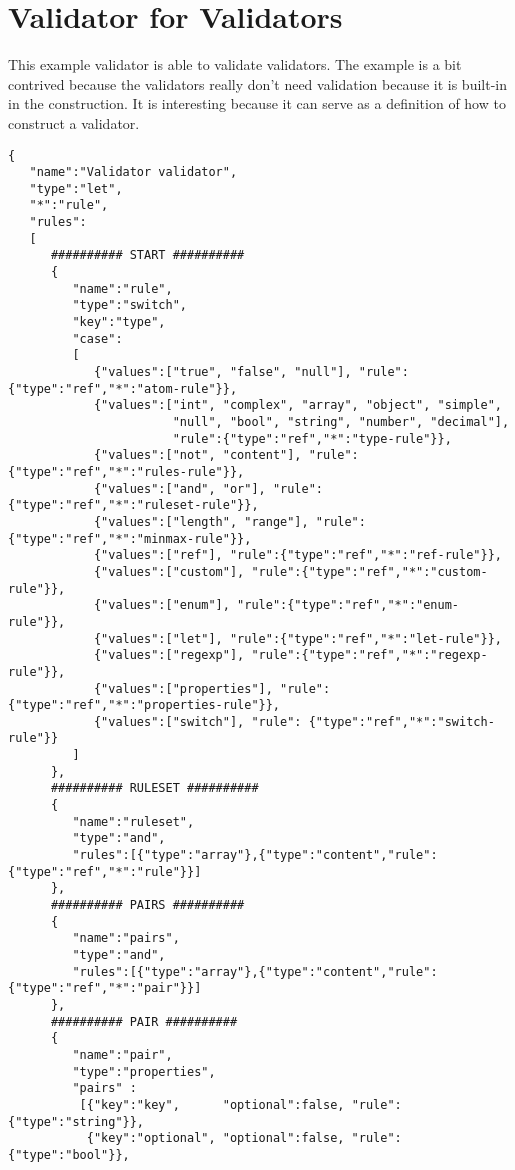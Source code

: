 \documentclass[a4paper]{article}
\begin{document}
\newpage
\section{ Validator for Validators }

 This example validator is able to validate validators. The example is a bit contrived because the validators really don't need validation because it is built-in in the construction. It is interesting because it can serve as a definition of how to construct a validator.
 
\medskip
\begin{lstlisting}[basicstyle=\ttfamily\scriptsize{}]
{
   "name":"Validator validator",
   "type":"let",
   "*":"rule",
   "rules":
   [
      ########## START ##########
      {
         "name":"rule",
         "type":"switch",
         "key":"type",
         "case":
         [
            {"values":["true", "false", "null"], "rule":{"type":"ref","*":"atom-rule"}},
            {"values":["int", "complex", "array", "object", "simple",
                       "null", "bool", "string", "number", "decimal"],
                       "rule":{"type":"ref","*":"type-rule"}},
            {"values":["not", "content"], "rule":{"type":"ref","*":"rules-rule"}},
            {"values":["and", "or"], "rule":{"type":"ref","*":"ruleset-rule"}},
            {"values":["length", "range"], "rule":{"type":"ref","*":"minmax-rule"}},
            {"values":["ref"], "rule":{"type":"ref","*":"ref-rule"}},
            {"values":["custom"], "rule":{"type":"ref","*":"custom-rule"}},
            {"values":["enum"], "rule":{"type":"ref","*":"enum-rule"}},
            {"values":["let"], "rule":{"type":"ref","*":"let-rule"}},
            {"values":["regexp"], "rule":{"type":"ref","*":"regexp-rule"}},
            {"values":["properties"], "rule":{"type":"ref","*":"properties-rule"}},
            {"values":["switch"], "rule": {"type":"ref","*":"switch-rule"}}
         ]
      },
      ########## RULESET ##########
      {
         "name":"ruleset",
         "type":"and",
         "rules":[{"type":"array"},{"type":"content","rule":{"type":"ref","*":"rule"}}]
      },
      ########## PAIRS ##########
      {
         "name":"pairs",
         "type":"and",
         "rules":[{"type":"array"},{"type":"content","rule":{"type":"ref","*":"pair"}}]
      },
      ########## PAIR ##########
      {
         "name":"pair",
         "type":"properties",
         "pairs" :
          [{"key":"key",      "optional":false, "rule":{"type":"string"}},
           {"key":"optional", "optional":false, "rule":{"type":"bool"}},

\end{lstlisting}
\end{document}
